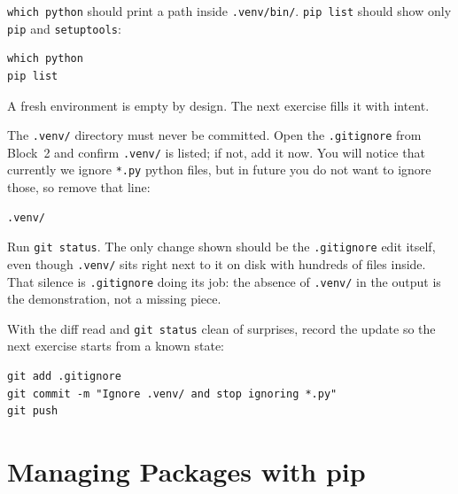 \texttt{which python} should print a path inside \texttt{.venv/bin/}.
\texttt{pip list} should show only \texttt{pip} and \texttt{setuptools}:

\begin{verbatim}
which python
pip list
\end{verbatim}

A fresh environment is empty by design.
The next exercise fills it with intent.

The \texttt{.venv/} directory must never be committed.
Open the \texttt{.gitignore} from Block~2 and confirm \texttt{.venv/} is
listed; if not, add it now. You will notice that currently we 
ignore \texttt{*.py} python files, but in future you do not want to ignore those, so remove that line:

\begin{verbatim}
.venv/
\end{verbatim}


Run \texttt{git status}. The only change shown should be the
\texttt{.gitignore} edit itself, even though \texttt{.venv/} sits right
next to it on disk with hundreds of files inside. That silence is
\texttt{.gitignore} doing its job: the absence of \texttt{.venv/} in the
output is the demonstration, not a missing piece.

With the diff read and \texttt{git status} clean of surprises, record the
update so the next exercise starts from a known state:

\begin{verbatim}
git add .gitignore
git commit -m "Ignore .venv/ and stop ignoring *.py"
git push
\end{verbatim}



\newpage
\section{Managing Packages with pip}


